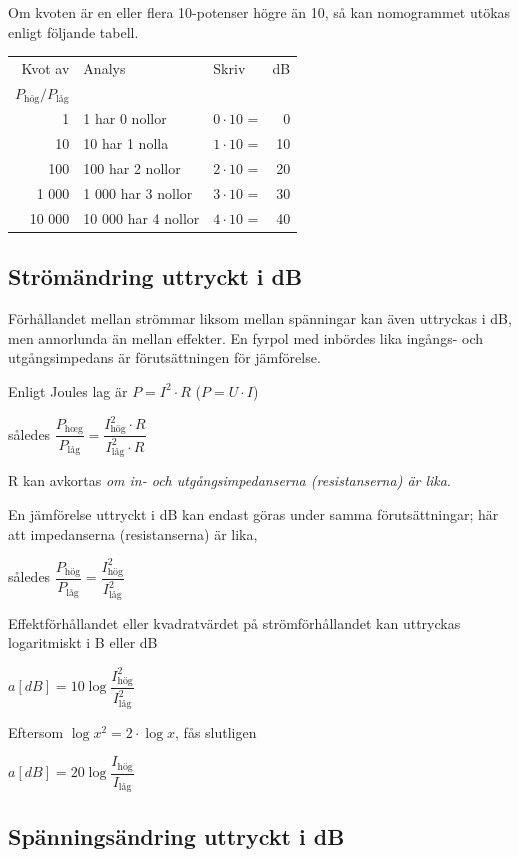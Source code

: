 Om kvoten är en eller flera 10-potenser högre än 10, så kan nomogrammet utökas
enligt följande tabell.

\begin{tabular}{rllr}
Kvot av & Analys             & Skriv            & dB \\
\(P_\text{hög}/P_\text{låg}\) &          &                  &    \\
     1 & 1 har 0 nollor      & \(0 \cdot 10\) = &  0 \\
    10 & 10 har 1 nolla      & \(1 \cdot 10\) = & 10 \\
   100 & 100 har 2 nollor    & \(2 \cdot 10\) = & 20 \\
 1 000 &  1 000 har 3 nollor & \(3 \cdot 10\) = & 30 \\
10 000 & 10 000 har 4 nollor & \(4 \cdot 10\) = & 40
\end{tabular}

\subsection{Strömändring uttryckt i dB}

Förhållandet mellan strömmar liksom mellan spänningar kan även uttryckas i dB,
men annorlunda än mellan effekter. En fyrpol med inbördes lika ingångs- och utgångsimpedans är förutsättningen för jämförelse.

Enligt Joules lag är \(P = I^2 \cdot R\) (\(P = U \cdot I\))

således \(\dfrac{P_\text{h{\oe}g}}{P_\text{l{\aa}g}} = \dfrac{I_\text{hög}^2 \cdot R}{I_\text{l{\aa}g}^2 \cdot R}\)

R kan avkortas \emph{om in- och utgångsimpedanserna (resistanserna) är lika}.

En jämförelse uttryckt i dB kan endast göras
under samma förutsättningar; här att impedanserna (resistanserna) är lika,

således \(\dfrac{P_\text{hög}}{P_\text{låg}} = \dfrac{I_\text{hög}^2}{I_\text{låg}^2}\)

Effektförhållandet eller kvadratvärdet på
strömförhållandet kan uttryckas logaritmiskt
i B eller dB

\(a[dB] = 10\log \dfrac{I_\text{hög}^2}{I_\text{låg}^2}\)

Eftersom \(\log x^2 = 2 \cdot \log x\), fås slutligen

\(a[dB] = 20\log \dfrac{I_\text{hög}}{I_\text{låg}}\)

\subsection{Spänningsändring uttryckt i dB}

